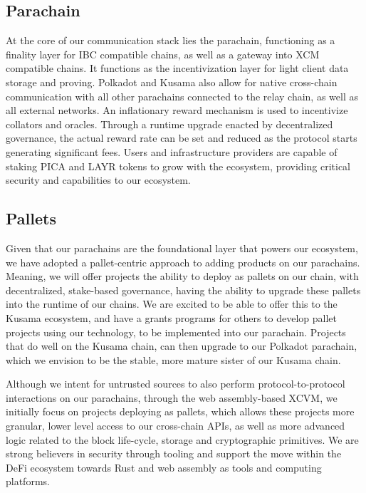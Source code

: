 \subsection{Parachain}
At the core of our communication stack lies the parachain, functioning as a finality layer for IBC compatible chains, as well as a gateway into XCM compatible chains. It functions as the incentivization layer for light client data storage and proving. Polkadot and Kusama also allow for native cross-chain communication with all other parachains connected to the relay chain, as well as all external networks. An inflationary reward mechanism is used to incentivize collators and oracles. Through a runtime upgrade enacted by decentralized governance, the actual reward rate can be set and reduced as the protocol starts generating significant fees. Users and infrastructure providers are capable of staking PICA and LAYR tokens to grow with the ecosystem, providing critical security and capabilities to our ecosystem. 

\subsection{Pallets}
Given that our parachains are the foundational layer that powers our ecosystem, we have adopted a pallet-centric approach to adding products on our parachains. Meaning, we will offer projects the ability to deploy as pallets on our chain, with decentralized, stake-based governance, having the ability to upgrade these pallets into the runtime of our chains. We are excited to be able to offer this to the Kusama ecosystem, and have a grants programs for others to develop pallet projects using our technology, to be implemented into our parachain. Projects that do well on the Kusama chain, can then upgrade to our Polkadot parachain, which we envision to be the stable, more mature sister of our Kusama chain. 

Although we intent for untrusted sources to also perform protocol-to-protocol interactions on our parachains, through the web assembly-based XCVM, we initially focus on projects deploying as pallets, which allows these projects more granular, lower level access to our cross-chain APIs, as well as more advanced logic related to the block life-cycle, storage and cryptographic primitives. We are strong believers in security through tooling and support the move within the DeFi ecosystem towards Rust and web assembly as tools and computing platforms.